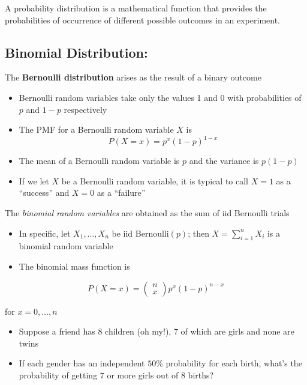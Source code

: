 \documentclass[]{article}
\begin{document}
A probability distribution is a mathematical function that provides the
probabilities of occurrence of different possible outcomes in an
experiment.

\hypertarget{binomial-distribution}{%
\subsection{Binomial Distribution:}\label{binomial-distribution}}

The \textbf{Bernoulli distribution} arises as the result of a binary
outcome

\begin{itemize}
\item
  Bernoulli random variables take only the values 1 and 0 with
  probabilities of \(p\) and \(1-p\) respectively
\item
  The PMF for a Bernoulli random variable \(X\) is
  \[P(X = x) =  p^x (1 - p)^{1 - x}\]
\item
  The mean of a Bernoulli random variable is \(p\) and the variance is
  \(p(1 - p)\)
\item
  If we let \(X\) be a Bernoulli random variable, it is typical to call
  \(X=1\) as a ``success'' and \(X=0\) as a ``failure''
\end{itemize}

The \emph{binomial random variables} are obtained as the sum of iid
Bernoulli trials

\begin{itemize}
\item
  In specific, let \(X_1,\ldots,X_n\) be iid Bernoulli\((p)\); then
  \(X = \sum_{i=1}^n X_i\) is a binomial random variable
\item
  The binomial mass function is
\end{itemize}

\[P(X = x) = \left(\begin{array}{c}n \\ x\end{array}\right)p^x(1 - p)^{n-x}\]

for \(x=0,\ldots,n\)

\begin{itemize}
\item
  Suppose a friend has \(8\) children (oh my!), \(7\) of which are girls
  and none are twins
\item
  If each gender has an independent \(50\)\% probability for each birth,
  what's the probability of getting \(7\) or more girls out of \(8\)
  births?
\end{itemize}
\end{document}
